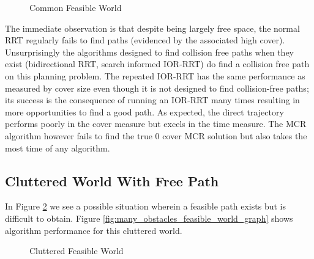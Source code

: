 \begin{figure}[!h]
    \hfill
    \caption{Common Feasible World}
    \label{fig:feasible_world}
\end{figure}

The immediate observation is that despite being largely free space, the normal RRT regularly fails to find paths (evidenced by the associated high cover). Unsurprisingly the algorithms designed to find collision free paths when they exist (bidirectional RRT, search informed IOR-RRT) do find a collision free path on this planning problem. The repeated IOR-RRT has the same performance as measured by cover size even though it is not designed to find collision-free paths; its success is the consequence of running an IOR-RRT many times resulting in more opportunities to find a good path. As expected, the direct trajectory performs poorly in the cover measure but excels in the time measure. The MCR algorithm however fails to find the true 0 cover MCR solution but also takes the most time of any algorithm.

\subsection{Cluttered World With Free Path}
In Figure \ref{fig:many_obstacles_feasible_world} we see a possible situation wherein a feasible path exists but is difficult to obtain. Figure \ref{fig:many_obstacles_feasible_world_graph} shows algorithm performance for this cluttered world.

\begin{figure}[!h]
    \hfill
    \caption{Cluttered Feasible World}
    \label{fig:many_obstacles_feasible_world}
\end{figure}



